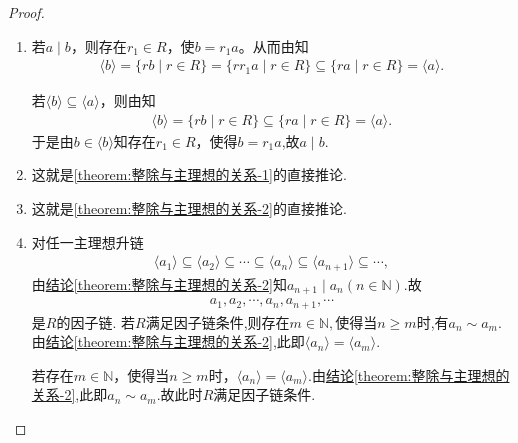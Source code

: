 \documentclass[../../main.tex]{subfiles}%
\begin{document}
\begin{proof}
\begin{enumerate}[(1)]
\item 若$a \mid b$，则存在$r_1 \in R$，使$b = r_1a$。从而由知
\begin{align*}
\langle b \rangle = \{ rb \mid r \in R \} = \{ rr_1a \mid r \in R \} \subseteq \{ ra \mid r \in R \} = \langle a \rangle.
\end{align*}

若$\langle b \rangle \subseteq \langle a \rangle$，则由知
\begin{align*}
\langle b \rangle = \{ rb \mid r \in R \} \subseteq \{ ra \mid r \in R \} = \langle a \rangle.
\end{align*}
于是由$b \in \langle b \rangle$知存在$r_1 \in R$，使得$b = r_1a$,故$a \mid b$.

\item 这就是\ref{theorem:整除与主理想的关系-1}的直接推论.

\item 这就是\ref{theorem:整除与主理想的关系-2}的直接推论.

\item 对任一主理想升链
\begin{align*}
\langle a_1 \rangle \subseteq \langle a_2 \rangle \subseteq \cdots \subseteq \langle a_n \rangle \subseteq \langle a_{n+1} \rangle \subseteq \cdots,
\end{align*}
由\hyperref[theorem:整除与主理想的关系-2]{结论\ref{theorem:整除与主理想的关系-2}}知$a_{n+1}\mid a_n(n\in \mathbb{N})$.故
\begin{align*}
a_1,a_2,\cdots ,a_n,a_{n+1},\cdots 
\end{align*}
是$R$的因子链.
若$R$满足因子链条件,则存在$m\in \mathbb{N},$使得当$n\geqslant m$时,有$a_n\sim a_m$.由\hyperref[theorem:整除与主理想的关系-2]{结论\ref{theorem:整除与主理想的关系-2}},此即$\langle a_n \rangle = \langle a_m \rangle$.

若存在$m\in \mathbb{N}$，使得当$n \geqslant m$时，$\langle a_n \rangle = \langle a_m \rangle$.由\hyperref[theorem:整除与主理想的关系-2]{结论\ref{theorem:整除与主理想的关系-2}},此即$a_n\sim a_m$.故此时$R$满足因子链条件.

\end{enumerate}
\end{proof}
\end{document}
